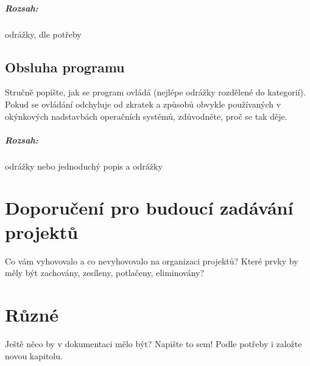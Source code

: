 \documentclass[12pt,a4paper,titlepage,final]{report}
\begin{document}
\paragraph{Rozsah:} odrážky, dle potřeby

\section{Obsluha programu}
Stručně popište, jak se program ovládá (nejlépe odrážky rozdělené do
kategorií). Pokud se ovládání odchyluje od zkratek a způsobů obvykle
používaných v okýnkových nadstavbách operačních systémů, zdůvodněte, proč se
tak děje.

\paragraph{Rozsah:} odrážky nebo jednoduchý popis a odrážky


\chapter{Doporučení pro budoucí zadávání projektů}

Co vám vyhovovalo a co nevyhovovalo na organizaci projektů? Které prvky by měly být zachovány, zesíleny, potlačeny, eliminovány?


\chapter{Různé}

Ještě něco by v dokumentaci mělo být? Napište to sem! Podle potřeby i založte
novou kapitolu.




\nocite{cite1}
\nocite{cite2}
\nocite{cite3}


\end{document}
